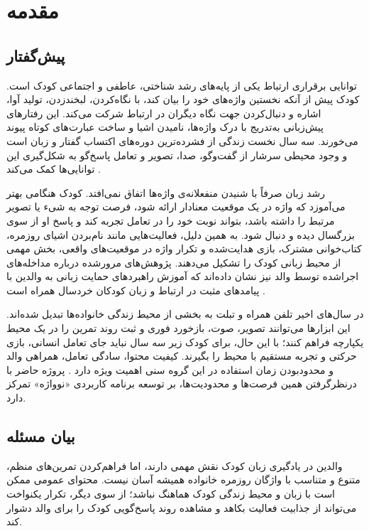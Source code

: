 \thispagestyle{empty}
\chapter{مقدمه}
\label{ch:introduction}

\section{پیش‌گفتار}

توانایی برقراری ارتباط یکی از پایه‌های رشد شناختی، عاطفی و اجتماعی کودک است. کودک پیش از آنکه نخستین واژه‌های خود را بیان کند، با نگاه‌کردن، لبخندزدن، تولید آوا، اشاره و دنبال‌کردن جهت نگاه دیگران در ارتباط شرکت می‌کند. این رفتارهای پیش‌زبانی به‌تدریج با درک واژه‌ها، نامیدن اشیا و ساخت عبارت‌های کوتاه پیوند می‌خورند. سه سال نخست زندگی از فشرده‌ترین دوره‌های اکتساب گفتار و زبان است و وجود محیطی سرشار از گفت‌وگو، صدا، تصویر و تعامل پاسخ‌گو به شکل‌گیری این توانایی‌ها کمک می‌کند \cite{NIDCDMilestones2022}.

رشد زبان صرفاً با شنیدن منفعلانه‌ی واژه‌ها اتفاق نمی‌افتد. کودک هنگامی بهتر می‌آموزد که واژه در یک موقعیت معنادار ارائه شود، فرصت توجه به شیء یا تصویر مرتبط را داشته باشد، بتواند نوبت خود را در تعامل تجربه کند و پاسخ او از سوی بزرگسال دیده و دنبال شود. به همین دلیل، فعالیت‌هایی مانند نام‌بردن اشیای روزمره، کتاب‌خوانی مشترک، بازی هدایت‌شده و تکرار واژه در موقعیت‌های واقعی، بخش مهمی از محیط زبانی کودک را تشکیل می‌دهند. پژوهش‌های مرورشده درباره مداخله‌های اجراشده توسط والد نیز نشان داده‌اند که آموزش راهبردهای حمایت زبانی به والدین با پیامدهای مثبت در ارتباط و زبان کودکان خردسال همراه است \cite{RobertsCurtis2019,RobertsKaiser2011}.

در سال‌های اخیر تلفن همراه و تبلت به بخشی از محیط زندگی خانواده‌ها تبدیل شده‌اند. این ابزارها می‌توانند تصویر، صوت، بازخورد فوری و ثبت روند تمرین را در یک محیط یکپارچه فراهم کنند؛ با این حال، برای کودک زیر سه سال نباید جای تعامل انسانی، بازی حرکتی و تجربه مستقیم با محیط را بگیرند. کیفیت محتوا، سادگی تعامل، همراهی والد و محدودبودن زمان استفاده در این گروه سنی اهمیت ویژه دارد \cite{WHO2019ScreenTime,AAPMedia2016}. پروژه حاضر با درنظرگرفتن همین فرصت‌ها و محدودیت‌ها، بر توسعه برنامه کاربردی «نوواژه» تمرکز دارد.

\section{بیان مسئله}

والدین در یادگیری زبان کودک نقش مهمی دارند، اما فراهم‌کردن تمرین‌های منظم، متنوع و متناسب با واژگان روزمره خانواده همیشه آسان نیست. محتوای عمومی ممکن است با زبان و محیط زندگی کودک هماهنگ نباشد؛ از سوی دیگر، تکرار یکنواخت می‌تواند از جذابیت فعالیت بکاهد و مشاهده روند پاسخ‌گویی کودک را برای والد دشوار کند.

